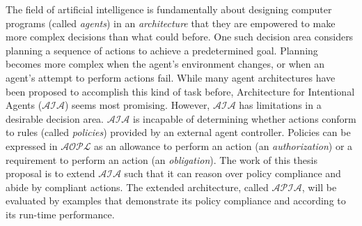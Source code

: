 The field of artificial intelligence is fundamentally about designing computer programs (called \textit{agents}) in an \textit{architecture} that they are empowered to make more complex decisions than what could before.
One such decision area considers planning a sequence of actions to achieve a predetermined goal.
Planning becomes more complex when the agent's environment changes, or when an agent's attempt to perform actions fail.
While many agent architectures have been proposed to accomplish this kind of task before, Architecture for Intentional Agents ($\mathcal{AIA}$) seems most promising.
However, $\mathcal{AIA}$ has limitations in a desirable decision area.
$\mathcal{AIA}$ is incapable of determining whether actions conform to rules (called \textit{policies}) provided by an external agent controller.
Policies can be expressed in $\mathcal{AOPL}$ as an allowance to perform an action (an \textit{authorization}) or a requirement to perform an action (an \textit{obligation}).
The work of this thesis proposal is to extend $\mathcal{AIA}$ such that it can reason over policy compliance and abide by compliant actions.
The extended architecture, called $\mathcal{APIA}$, will be evaluated by examples that demonstrate its policy compliance and according to its run-time performance.
